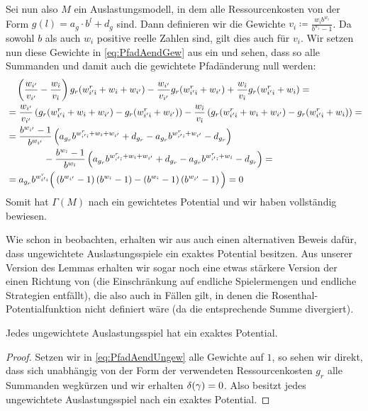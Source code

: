 Sei nun also $M$ ein Auslastungsmodell, in dem alle Ressourcenkosten von der Form $g(l) = a_g\cdot b^l + d_g$ sind. Dann definieren wir die Gewichte $v_i \coloneqq \frac{w_i b^{w_i}}{b^{w_i}-1}$. Da sowohl $b$ als auch $w_i$ positive reelle Zahlen sind, gilt dies auch für $v_i$. Wir setzen nun diese Gewichte in \eqref{eq:PfadAendGew} aus  ein und sehen, dass so alle Summanden und damit auch die gewichtete Pfadänderung null werden:
\begin{align*}
	&\quad \left(\frac{w_{i'}}{v_{i'}} - \frac{w_{\hat{\imath}}}{v_{\hat{\imath}}}\right) g_r({w^r_{{i'}{\hat{\imath}}}} + w_{\hat{\imath}} + w_{i'}) - \frac{w_{i'}}{v_{i'}} g_r({w^r_{{i'}{\hat{\imath}}}} + w_{i'})  + \frac{w_{\hat{\imath}}}{v_{\hat{\imath}}} g_r({w^r_{{i'}{\hat{\imath}}}} + w_{\hat{\imath}}) =\\
	&= \frac{w_{i'}}{v_{i'}}\left(g_r({w^r_{{i'}{\hat{\imath}}}} + w_{\hat{\imath}} + w_{i'}) - g_r({w^r_{{i'}{\hat{\imath}}}} + w_{i'})\right) - \frac{w_{\hat{\imath}}}{v_{\hat{\imath}}}\left(g_r({w^r_{{i'}{\hat{\imath}}}} + w_{\hat{\imath}} + w_{i'}) - g_r({w^r_{{i'}{\hat{\imath}}}} + w_{\hat{\imath}})\right) =\\
	&= \frac{b^{w_{i'}}-1}{b^{w_{i'}}}\left(a_{g_r}b^{{w^r_{{i'}{\hat{\imath}}}} + w_{\hat{\imath}} + w_{i'}}+d_{g_r} - a_{g_r} b^{{w^r_{{i'}{\hat{\imath}}}} + w_{i'}} - d_{g_r}\right) \\
	&  \hspace{4em} -\frac{b^{w_{\hat{\imath}}}-1}{b^{w_{\hat{\imath}}}}\left(a_{g_r}b^{{w^r_{{i'}{\hat{\imath}}}} + w_{\hat{\imath}} + w_{i'}}+d_{g_r} - a_{g_r} b^{{w^r_{{i'}{\hat{\imath}}}} + w_{i}} - d_{g_r}\right) =\\
	&= a_{g_r}b^{w^r_{{i'}{\hat{\imath}}}} \Big(\left(b^{w_{i'}}-1\right)\left(b^{w_{\hat{\imath}}}-1\right) - \left(b^{w_{\hat{\imath}}}-1\right)\left(b^{w_{i'}}-1\right)\Big) = 0
\end{align*}
Somit hat $\Gamma(M)$ nach  ein gewichtetes Potential und wir haben  vollständig bewiesen.

Wie schon \citeauthor{CharExGewPotinWCG} in \cite{CharExGewPotinWCG} beobachten, erhalten wir aus  auch einen alternativen Beweis dafür, dass ungewichtete Auslastungsspiele ein exaktes Potential besitzen. Aus unserer Version des Lemmas erhalten wir sogar noch eine etwas stärkere Version der einen Richtung von  (die Einschränkung auf endliche Spielermengen und endliche Strategien entfällt), die also auch in Fällen gilt, in denen die Rosenthal-Potentialfunktion nicht definiert wäre (da die entsprechende Summe divergiert).

\begin{kor}\label{kor:MondererShapleyUnendl}
	Jedes ungewichtete Auslastungsspiel hat ein exaktes Potential.
\end{kor}

\begin{proof}
	Setzen wir in \eqref{eq:PfadAendUngew} alle Gewichte auf $1$, so sehen wir direkt, dass sich unabhängig von der Form der verwendeten Ressourcenkosten $g_r$ alle Summanden wegkürzen und wir erhalten $\delta(\gamma) = 0$. Also besitzt jedes ungewichtete Auslastungsspiel nach  ein exaktes Potential.
\end{proof}

